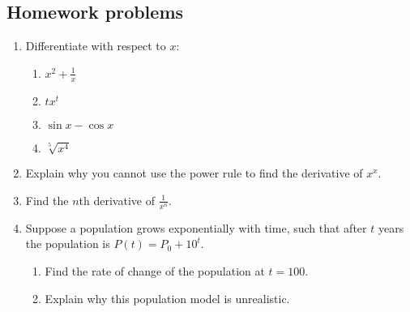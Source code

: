 \subsection{Homework problems}
\begin{enumerate}
  \item Differentiate with respect to $ x $:
    \begin{enumerate}
      \item $ x^2 + \frac{1}{x} $
      \item $ tx^t $
      \item $ \sin x - \cos x $
      \item $ \sqrt[5]{x^4} $
    \end{enumerate}
  \item Explain why you cannot use the power rule to find the derivative of $ x^x $.
  \item Find the $ n$th derivative of $ \frac{1}{x^n} $.
  \item Suppose a population grows exponentially with time, such that after $ t $ years the population is $ P(t) = P_0 + 10^t $.
    \begin{enumerate}
      \item Find the rate of change of the population at $ t = 100 $.
      \item Explain why this population model is unrealistic.
    \end{enumerate}
\end{enumerate}
